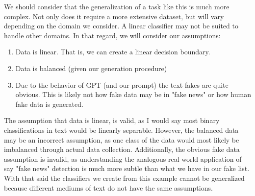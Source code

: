 \documentclass{article}
\begin{document}
We should consider that the generalization of a task like this is much more complex. Not only does it require a more extensive dataset, but will vary depending on the domain we consider. A linear classifier may not be suited to handle other domains. In that regard, we will consider our assumptions: 
\begin{enumerate}
    \item Data is linear. That is, we can create a linear decision boundary. 
    \item Data is balanced (given our generation procedure)
    \item Due to the behavior of GPT (and our prompt) the text fakes are quite obvious. This is likely not how fake data may be in "fake news" or how human fake data is generated. 
\end{enumerate}
The assumption that data is linear, is valid, as I would say most binary classifications in text would be linearly separable. However, the balanced data may be an incorrect assumption, as one class of the data would most likely be imbalanced through actual data collection. Additionally, the obvious fake data assumption is invalid, as understanding the analogous real-world application of say "fake news" detection is much more subtle than what we have in our fake list. With that said the classifiers we create from this example cannot be generalized because different mediums of text do not have the same assumptions.
\end{document}
